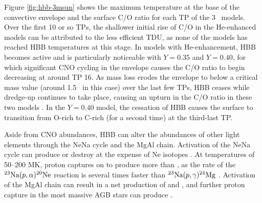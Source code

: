 Figure \ref{fig:hbb-3msun} shows the maximum temperature at the base of the convective envelope and the surface C/O ratio for each TP of the 3 \Msun\ models. Over the first 10 or so TPs, the shallower initial rise of C/O in the He-enhanced models can be attributed to the less efficient TDU, as none of the models has reached HBB temperatures at this stage. In models with He-enhancement, HBB becomes active and is particularly noticeable with $Y=0.35$ and $Y=0.40$, for which significant CNO cycling in the envelope causes the C/O ratio to begin decreasing at around TP 16. As mass loss erodes the envelope to below a critical mass value (around 1.5 \Msun\ in this case) over the last few TPs, HBB ceases while dredge-up continues to take place, causing an upturn in the C/O ratio in these two models \citep[see][]{Frost:1998vn}. In the $Y=0.40$ model, the cessation of HBB causes the surface to transition from O-rich to C-rich (for a second time) at the third-last TP.

Aside from CNO abundances, HBB can alter the abundances of other light elements through the NeNa cycle and the MgAl chain. Activation of the NeNa cycle can produce or destroy  at the expense of Ne isotopes \citep{Arnould:1999ue,Mowlavi:1999ut,Karakas:2003el}. At temperatures of 50--200 MK, proton captures on to  produce more  than , as the rate of the $\mbox{${}^{23}{\text{Na}}$}(p,\alpha)\mbox{${}^{20}{\text{Ne}}$}$ reaction is several times faster than $\mbox{${}^{23}{\text{Na}}$}(p,\gamma)\mbox{${}^{24}{\text{Mg}}$}$ \citep{Hale:2004fa}. Activation of the MgAl chain can result in a net production of  and  \citep{Arnould:1999ue,Denissenkov:2003bn,Ventura:2008iv}, and further proton capture in the most massive AGB stars can produce  \citep{Ventura:2011kn}.

